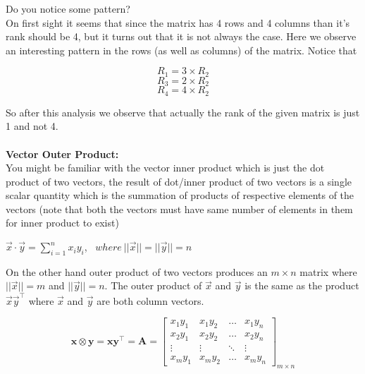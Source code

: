 \documentclass{article}
\begin{document}
Do you notice some pattern? \\
On first sight it seems that since the matrix has 4 rows and 4 columns than it's rank should be 4, but it turns out that it is not always the case. Here we observe an interesting pattern in the rows (as well as columns) of the matrix. Notice that

\begin{equation}
    R_{1} = 3 \times R_{2}
\end{equation}
\begin{equation}
    R_{3} = 2 \times R_{2}
\end{equation}
\begin{equation}
    R_{4} = 4 \times R_{2}
\end{equation}

So after this analysis we observe that actually the rank of the given matrix is just 1 and not 4. \\ \\

\textbf{Vector Outer Product:} \\
You might be familiar with the vector inner product which is just the dot product of two vectors, the result of dot/inner product of two vectors is a single scalar quantity which is the summation of products of respective elements of the vectors (note that both the vectors must have same number of elements in them for inner product to exist) \\

\begin{center}
    $\vec{x}\cdot\vec{y} = \sum_{i=1}^{n} x_{i}y_{i}$, \
    $ where \ ||\vec{x}|| = ||\vec{y}|| = n$
\end{center}

On the other hand outer product of two vectors produces an $m \times n$ matrix where $||\vec{x}|| = m$ and $||\vec{y}|| = n$. The outer product of $\vec{x}$ and $\vec{y}$ is the same as the product $\vec{x}\vec{y}^{\top}$ where $\vec{x}$ and $\vec{y}$ are both column vectors.

$$
{\displaystyle 
    \mathbf {x} \otimes \mathbf {y} =\mathbf{x}\mathbf{y^{\top}} =\mathbf {A} =
    {\begin{bmatrix} 
        x_{1}y_{1} & x_{1}y_{2} & \dots & x_{1}y_{n} \\ 
        x_{2}y_{1} & x_{2}y_{2} & \dots & x_{2}y_{n} \\ 
        \vdots & \vdots & \ddots & \vdots \\ 
        x_{m}y_{1} & x_{m}y_{2} & \dots & x_{m}y_{n}
    \end{bmatrix}_{m \times n}}
}
$$
\end{document}
